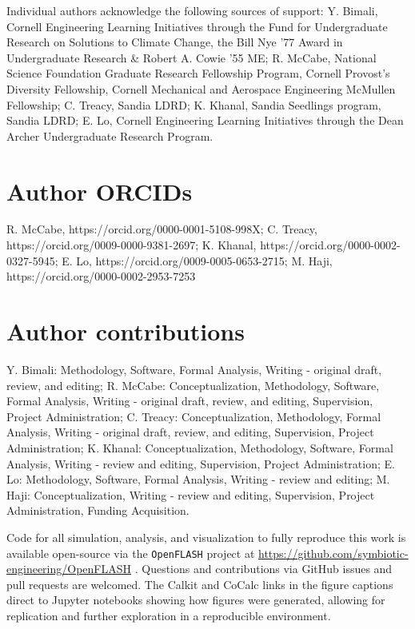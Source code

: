 \documentclass[lineno]{JFM-FLM_Au}
\begin{document}
    Individual authors acknowledge the following sources of support:
    Y. Bimali, Cornell Engineering Learning Initiatives through the Fund for Undergraduate Research on Solutions to Climate Change, the Bill Nye '77 Award in Undergraduate Research \& Robert A. Cowie '55 ME;
    R. McCabe, National Science Foundation Graduate Research Fellowship Program, Cornell Provost's Diversity Fellowship, Cornell Mechanical and Aerospace Engineering McMullen Fellowship; 
    C. Treacy, Sandia LDRD; 
    K. Khanal, Sandia Seedlings program, Sandia LDRD; 
    E. Lo, Cornell Engineering Learning Initiatives through the Dean Archer Undergraduate Research Program.


    \section*{Author ORCIDs}
        R. McCabe, https://orcid.org/0000-0001-5108-998X;
        C. Treacy, https://orcid.org/0009-0000-9381-2697;
        K. Khanal, https://orcid.org/0000-0002-0327-5945;
        E. Lo, https://orcid.org/0009-0005-0653-2715;
        M. Haji, https://orcid.org/0000-0002-2953-7253

    \section*{Author contributions}
        Y. Bimali: Methodology, Software, Formal Analysis, Writing - original draft, review, and editing;
        R. McCabe: Conceptualization, Methodology, Software, Formal Analysis, Writing - original draft, review, and editing, Supervision, Project Administration;
        C. Treacy: Conceptualization, Methodology, Formal Analysis, Writing - original draft, review, and editing, Supervision, Project Administration;
        K. Khanal: Conceptualization, Methodology, Software, Formal Analysis, Writing - review and editing, Supervision, Project Administration;
        E. Lo: Methodology, Software, Formal Analysis, Writing - review and editing;
        M. Haji: Conceptualization, Writing - review and editing, Supervision, Project Administration, Funding Acquisition.

\else

    \begin{bmhead}
    Code for all simulation, analysis, and visualization to fully reproduce this work is available open-source via the \texttt{OpenFLASH} project at
    \url{https://github.com/symbiotic-engineering/OpenFLASH} \citep{best_openflash_2026,best_openflash-code_2026}.
    Questions and contributions via GitHub issues and pull requests are welcomed.
    The Calkit and CoCalc links in the figure captions direct to Jupyter notebooks showing how figures were generated, allowing for replication and further exploration in a reproducible environment.
    \end{bmhead}
\end{document}
